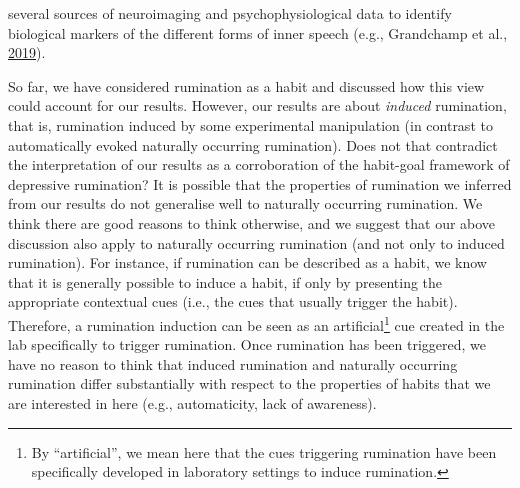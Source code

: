 \documentclass[a4paper,12pt,twoside,onecolumn,openright,final,oldfontcommands]{memoir}
\let\rmarkdownfootnote\footnote%
\def\footnote{\protect\rmarkdownfootnote}
\begin{document}
several sources of neuroimaging and psychophysiological data to identify biological markers of the different forms of inner speech (e.g., Grandchamp et al., \protect\hyperlink{ref-grandchamp_condensation_2019}{2019}).

So far, we have considered rumination as a habit and discussed how this view could account for our results. However, our results are about \emph{induced} rumination, that is, rumination induced by some experimental manipulation (in contrast to automatically evoked naturally occurring rumination). Does not that contradict the interpretation of our results as a corroboration of the habit-goal framework of depressive rumination? It is possible that the properties of rumination we inferred from our results do not generalise well to naturally occurring rumination. We think there are good reasons to think otherwise, and we suggest that our above discussion also apply to naturally occurring rumination (and not only to induced rumination). For instance, if rumination can be described as a habit, we know that it is generally possible to induce a habit, if only by presenting the appropriate contextual cues (i.e., the cues that usually trigger the habit). Therefore, a rumination induction can be seen as an artificial\footnote{By \enquote{artificial}, we mean here that the cues triggering rumination have been specifically developed in laboratory settings to induce rumination.} cue created in the lab specifically to trigger rumination. Once rumination has been triggered, we have no reason to think that induced rumination and naturally occurring rumination differ substantially with respect to the properties of habits that we are interested in here (e.g., automaticity, lack of awareness).
\end{document}
